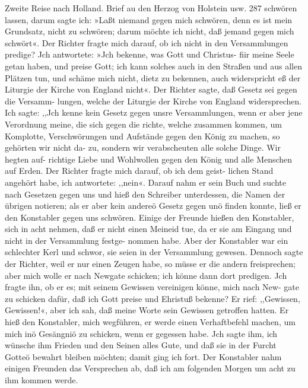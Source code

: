 Zweite Reise nach Holland. Brief au den Herzog von Holstein usw. 287
schwören lassen, darum sagte ich: »Laßt niemand gegen mich
schwören, denn es ist mein Grundsatz, nicht zu schwören; darum
möchte ich nicht, daß jemand gegen mich schwört«. Der Richter
fragte mich darauf, ob ich nicht in den Versammlungen predige?
Jch antwortete: »Jch bekenne, was Gott und Christus- fiir meine
Seele getan haben, und preise Gott; ich kann solches auch in den
Straßen und aus allen Plätzen tun, und schäme mich nicht, dietz zu
bekennen, auch widerspricht eß der Liturgie der Kirche von England
nicht«. Der Richter sagte, daß Gesetz sei gegen die Versamm-
lungen, welche der Liturgie der Kirche von England widersprechen.
Ich sagte: ,,Jch kenne kein Gesetz gegen unsre Versammlungen,
wenn er aber jene Verordnung meine, die sich gegen die richte,
welche zusammen kommen, um Komplotte, Verschwörungen und
Aufstände gegen den König zu machen, so gehörten wir nicht da-
zu, sondern wir verabscheuten alle solche Dinge. Wir hegten auf-
richtige Liebe und Wohlwollen gegen den König und alle Menschen
auf Erden. Der Richter fragte mich darauf, ob ich dem geist-
lichen Stand angehört habe, ich antwortete: ,,nein«. Darauf
nahm er sein Buch und suchte nach Gesetzen gegen uns und hieß
den Schreiber unterdessen, die Namen der übrigen notieren; als
er aber kein andereö Gesetz gegen unö finden konnte, ließ er den
Konstabler gegen uns schwören. Einige der Freunde hießen den
Konstabler, sich in acht nehmen, daß er nicht einen Meineid tue,
da er sie am Eingang und nicht in der Versammlung festge-
nommen habe. Aber der Konstabler war ein schlechter Kerl und
schwor, sie seien in der Versammlung gewesen.
Dennoch sagte der Richter, weil er nur einen Zeugen habe,
so müsse er die andern freisprechen; aber mich wolle er nach
Newgate schicken; ich könne dann dort predigen. Jch fragte ihn,
ob er es; mit seinem Gewissen vereinigen könne, mich nach New-
gate zu schicken dafür, daß ich Gott preise und Ehristuß bekenne?
Er rief: ,,Gewissen, Gewissen!«, aber ich sah, daß meine Worte
sein Gewissen getroffen hatten. Er hieß den Konstabler, mich
wegführen, er werde einen Verhaftbefehl machen, um mich inö
Gesängniö zu schicken, wenn er gegessen habe. Jch sagte ihm,
ich wünsche ihm Frieden und den Seinen alles Gute, und daß sie
in der Furcht Gotteö bewahrt bleiben möchten; damit ging ich
fort. Der Konstabler nahm einigen Freunden das Versprechen
ab, daß ich am folgenden Morgen um acht zu ihm kommen werde.


